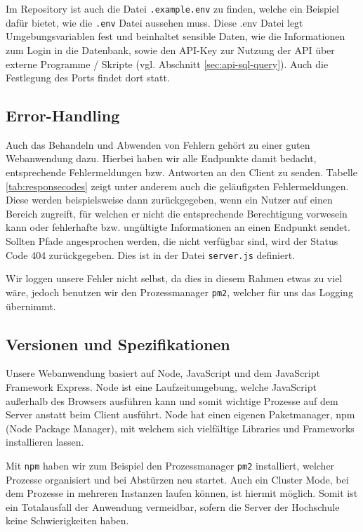 Im Repository ist auch die Datei \verb|.example.env| zu finden, welche ein Beispiel dafür bietet, wie die \verb|.env| Datei aussehen muss. Diese .env Datei legt Umgebungsvariablen fest und beinhaltet sensible Daten, wie die Informationen zum Login in die Datenbank, sowie den API-Key zur Nutzung der API über externe Programme / Skripte (vgl. Abschnitt \ref{sec:api-sql-query}). Auch die Festlegung des Ports findet dort statt.\\


\subsection{Error-Handling}
\label{sec:nodechapter-error-handling}
Auch das Behandeln und Abwenden von Fehlern gehört zu einer guten Webanwendung dazu. Hierbei haben wir alle Endpunkte damit bedacht, entsprechende Fehlermeldungen bzw. Antworten an den Client zu senden. Tabelle \ref{tab:responsecodes} zeigt unter anderem auch die geläufigsten Fehlermeldungen. Diese werden beispielsweise dann zurückgegeben, wenn ein Nutzer auf einen Bereich zugreift, für welchen er nicht die entsprechende Berechtigung vorwesein kann oder fehlerhafte bzw. ungültigte Informationen an einen Endpunkt sendet. Sollten Pfade angesprochen werden, die nicht verfügbar sind, wird der Status Code 404 zurückgegeben. Dies ist in der Datei \verb|server.js| definiert.

Wir loggen unsere Fehler nicht selbst, da dies in diesem Rahmen etwas zu viel wäre, jedoch benutzen wir den Prozessmanager \verb|pm2|, welcher für uns das Logging übernimmt.\\


\subsection{Versionen und Spezifikationen}
\label{sec:nodechapter-versions}
Unsere Webanwendung basiert auf Node, JavaScript und dem JavaScript Framework Express. Node ist eine Laufzeitumgebung, welche JavaScript außerhalb des Browsers ausführen kann und somit wichtige Prozesse auf dem Server anstatt beim Client ausführt. Node hat einen eigenen Paketmanager, npm (Node Package Manager), mit welchem sich vielfältige Libraries und Frameworks installieren lassen.

Mit \verb|npm| haben wir zum Beispiel den Prozessmanager \verb|pm2| installiert, welcher Prozesse organisiert und bei Abstürzen neu startet. Auch ein Cluster Mode, bei dem Prozesse in mehreren Instanzen laufen können, ist hiermit möglich. Somit ist ein Totalausfall der Anwendung vermeidbar, sofern die Server der Hochschule keine Schwierigkeiten haben.

